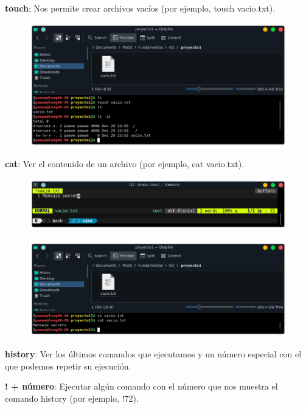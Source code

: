 \documentclass{article}
\begin{document}
\textbf{touch}: Nos permite crear archivos vacíos (por ejemplo, touch
vacio.txt).

\begin{figure}[h!]
  \centering
  \includegraphics[scale=0.7]{./Pictures/062_touch.png}
\end{figure}

\textbf{cat}: Ver el contenido de un archivo (por ejemplo, cat vacio.txt).

\begin{figure}[h!]
  \centering
  \includegraphics[scale=0.7]{./Pictures/063_vi_editando.png}
\end{figure}

\begin{figure}[h!]
  \centering
  \includegraphics[scale=0.7]{./Pictures/064_cat.png}
\end{figure}

\textbf{history}: Ver los últimos comandos que ejecutamos y un número especial
con el que podemos repetir su ejecución.

\textbf{! + número}: Ejecutar algún comando con el número que nos muestra el
comando history (por ejemplo, !72).
\end{document}
